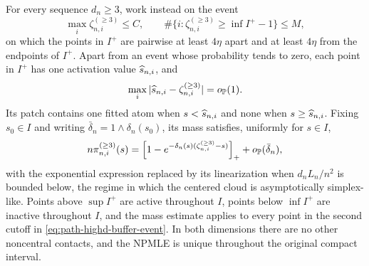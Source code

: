 \begin{proposition}
For every sequence \(d_n\ge3\), work instead on the event
\begin{equation}
\label{eq:path-highd-buffer-event}
 \max_i\zeta_{n,i}^{(\ge3)}\le C,
 \qquad
 \#\{i:\zeta_{n,i}^{(\ge3)}\ge\inf I^+-1\}\le M,
\end{equation}
on which the points in \(I^+\) are pairwise at least \(4\eta\) apart and at
least \(4\eta\) from the endpoints of \(I^+\). Apart from an event whose
probability tends to zero, each point in \(I^+\) has one activation value
\(\widehat s_{n,i}\), and
\begin{equation}
\label{eq:path-highd-activation}
 \max_i|\widehat s_{n,i}-\zeta_{n,i}^{(\ge3)}|=o_{\mathbb P}(1).
\end{equation}
Its patch contains one fitted atom when \(s<\widehat s_{n,i}\) and none when
\(s\ge\widehat s_{n,i}\). Fixing \(s_0\in I\) and writing
\(\bar\delta_n=1\wedge\delta_n(s_0)\), its mass satisfies, uniformly for
\(s\in I\),
\begin{equation}
\label{eq:path-highd-patch-mass}
 n\pi_{n,i}^{(\ge3)}(s)
 =\left[1-e^{-\delta_n(s)(\zeta_{n,i}^{(\ge3)}-s)}\right]_+
  +o_{\mathbb P}(\bar\delta_n),
\end{equation}
with the exponential expression replaced by its linearization when
\(d_nL_n/n^2\) is bounded below, the regime in which the centered cloud is
asymptotically simplex-like. Points above \(\sup I^+\) are active throughout \(I\), points
below \(\inf I^+\) are inactive throughout \(I\), and the mass estimate applies
to every point in the second cutoff in \eqref{eq:path-highd-buffer-event}. In
both dimensions there are no other noncentral contacts, and the NPMLE is
unique throughout the original compact interval.
\end{proposition}

